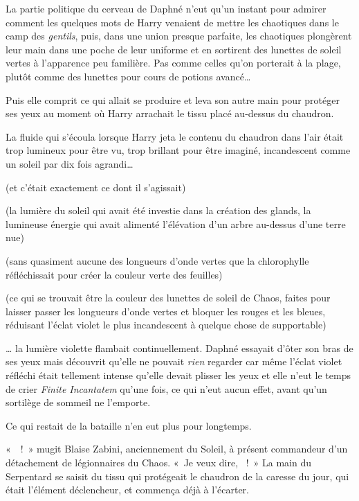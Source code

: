 La partie politique du cerveau de Daphné n'eut qu'un instant pour admirer comment les quelques mots de Harry venaient de mettre les chaotiques dans le camp des \emph{gentils}, puis, dans une union presque parfaite, les chaotiques plongèrent leur main dans une poche de leur uniforme et en sortirent des lunettes de soleil vertes à l'apparence peu familière.
Pas comme celles qu'on porterait à la plage, plutôt comme des lunettes pour cours de potions avancé…

Puis elle comprit ce qui allait se produire et leva son autre main pour protéger ses yeux au moment où Harry arrachait le tissu placé au-dessus du chaudron.

La fluide qui s'écoula lorsque Harry jeta le contenu du chaudron dans l'air était trop lumineux pour être vu, trop brillant pour être imaginé, incandescent comme un soleil par dix fois agrandi…

(et c'était exactement ce dont il s'agissait)

(la lumière du soleil qui avait été investie dans la création des glands, la lumineuse énergie qui avait alimenté l'élévation d'un arbre au-dessus d'une terre nue)

(sans quasiment aucune des longueurs d'onde vertes que la chlorophylle réfléchissait pour créer la couleur verte des feuilles)

(ce qui se trouvait être la couleur des lunettes de soleil de Chaos, faites pour laisser passer les longueurs d'onde vertes et bloquer les rouges et les bleues, réduisant l'éclat violet le plus incandescent à quelque chose de supportable)

… la lumière violette flambait continuellement.
Daphné essayait d'ôter son bras de ses yeux mais découvrit qu'elle ne pouvait \emph{rien} regarder car même l'éclat violet réfléchi était tellement intense qu'elle devait plisser les yeux et elle n'eut le temps de crier \emph{Finite Incantatem} qu'une fois, ce qui n'eut aucun effet, avant qu'un sortilège de sommeil ne l'emporte.

Ce qui restait de la bataille n'en eut plus pour longtemps.

\later

«~~!~»
mugit Blaise Zabini, anciennement du Soleil, à présent commandeur d'un détachement de légionnaires du Chaos.
«~Je veux dire, ~!~»
La main du Serpentard se saisit du tissu qui protégeait le chaudron de la caresse du jour, qui était l'élément déclencheur, et commença déjà à l'écarter.

